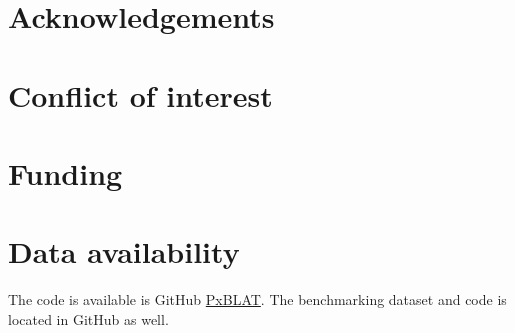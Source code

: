 \section*{Acknowledgements}\label{sec:acknowledgements}


\section*{Conflict of interest}\label{sec:conflict-of-interest}


\section*{Funding}\label{sec:funding}


\section*{Data availability}\label{sec:data-availability}


The code is available is GitHub \href{https://github.com/cauliyang/pxblat}{PxBLAT}.
The benchmarking dataset and code is located in  GitHub as well.







